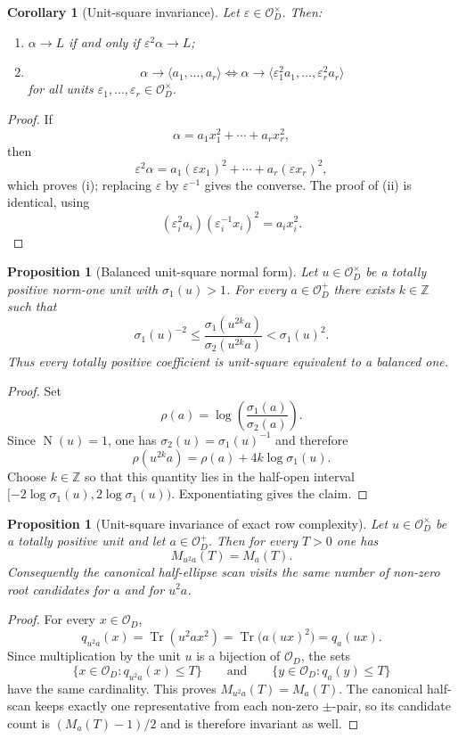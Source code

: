 \documentclass[manuscript]{acmart}
\theoremstyle{plain}
\newtheorem{proposition}[theorem]{Proposition}
\newtheorem{corollary}[theorem]{Corollary}
\theoremstyle{definition}
\theoremstyle{nonitalicremark}
\newcommand{\Z}{\mathbb{Z}}
\newcommand{\OO}{\mathcal{O}}
\newcommand{\OD}{\OO_D}
\newcommand{\Tr}{\operatorname{Tr}}
\newcommand{\N}{\operatorname{N}}
\newcommand{\eps}{\varepsilon}
\begin{document}
\begin{corollary}[Unit-square invariance]\label{cor:units}
Let $\eps\in\OD^\times$. Then:
\begin{enumerate}[label=\textup{(\roman*)}]
\item $\alpha\to L$ if and only if $\eps^2\alpha\to L$;
\item
\[
\alpha\to\langle a_1,\dots,a_r\rangle
\iff
\alpha\to\langle \eps_1^2a_1,\dots,\eps_r^2a_r\rangle
\]
for all units $\eps_1,\dots,\eps_r\in\OD^\times$.
\end{enumerate}
\end{corollary}

\begin{proof}
If
\[
\alpha=a_1x_1^2+\cdots+a_rx_r^2,
\]
then
\[
\eps^2\alpha=a_1(\eps x_1)^2+\cdots+a_r(\eps x_r)^2,
\]
which proves \textup{(i)}; replacing $\eps$ by $\eps^{-1}$ gives the converse. The proof of
\textup{(ii)} is identical, using
\[
(\eps_i^2a_i)(\eps_i^{-1}x_i)^2 = a_i x_i^2.
\]
\end{proof}

\begin{proposition}[Balanced unit-square normal form]\label{prop:balanced}
Let $u\in\OD^\times$ be a totally positive norm-one unit with $\sigma_1(u)>1$. For every
$a\in\OD^+$ there exists $k\in\Z$ such that
\[
\sigma_1(u)^{-2}
\le
\frac{\sigma_1(u^{2k}a)}{\sigma_2(u^{2k}a)}
<
\sigma_1(u)^2.
\]
Thus every totally positive coefficient is unit-square equivalent to a balanced one.
\end{proposition}

\begin{proof}
Set
\[
\rho(a)=\log\!\left(\frac{\sigma_1(a)}{\sigma_2(a)}\right).
\]
Since $\N(u)=1$, one has $\sigma_2(u)=\sigma_1(u)^{-1}$ and therefore
\[
\rho(u^{2k}a)=\rho(a)+4k\log\sigma_1(u).
\]
Choose $k\in\Z$ so that this quantity lies in the half-open interval
$[-2\log\sigma_1(u), 2\log\sigma_1(u))$. Exponentiating gives the claim.
\end{proof}

\begin{proposition}[Unit-square invariance of exact row complexity]\label{prop:balance-invariant}
Let $u\in\OD^\times$ be a totally positive unit and let $a\in\OD^+$. Then for every $T>0$ one has
\[
M_{u^2a}(T)=M_a(T).
\]
Consequently the canonical half-ellipse scan visits the same number of non-zero root candidates for
$a$ and for $u^2a$.
\end{proposition}

\begin{proof}
For every $x\in\OD$,
\[
q_{u^2a}(x)=\Tr(u^2ax^2)=\Tr\bigl(a(ux)^2\bigr)=q_a(ux).
\]
Since multiplication by the unit $u$ is a bijection of $\OD$, the sets
\[
\{x\in\OD:q_{u^2a}(x)\le T\}
\qquad\text{and}\qquad
\{y\in\OD:q_a(y)\le T\}
\]
have the same cardinality. This proves $M_{u^2a}(T)=M_a(T)$. The canonical half-scan keeps exactly
one representative from each non-zero $\pm$-pair, so its candidate count is $(M_a(T)-1)/2$ and is
therefore invariant as well.
\end{proof}
\end{document}
